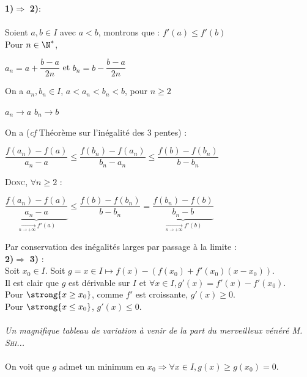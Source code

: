 \documentclass[12pt,a4paper]{report}
\begin{document}
\begin{demo}
\textbf{1)}$\Longrightarrow$ \textbf{2)}\footnotemark : \\
\\
Soient $a,b \in I$ avec $a<b$, montrons que : $f'(a)\leq f'(b)$\\
Pour $n\in \N^*$,
\begin{center}
    $a_n = a+ \dfrac{b-a}{2n}$ et $b_n = b- \dfrac{b-a}{2n}$
\end{center} 
On a $a_n,b_n \in I$, $a<a_n<b_n<b$, pour $n\geq 2$
\begin{center}
    $a_n \to a$ \: \: \: \: \: \:$b_n \to b$
\end{center}
On a (\textit{cf} Théorème sur l'inégalité des 3 pentes) :
\begin{center}
    $\dfrac{f(a_n)-f(a)}{a_n - a} \leq \dfrac{f(b_n)-f(a_n)}{b_n - a_n} \leq \dfrac{f(b)-f(b_n)}{b - b_n}$
\end{center}
\textsc{Donc, $\forall n \geq 2$ :}
\begin{center}
    $\underbrace{\dfrac{f(a_n)-f(a)}{a_n - a}}_{\xrightarrow[n \to + \infty]{}f'(a)}\leq \dfrac{f(b)-f(b_n)}{b - b_n} = \underbrace{\dfrac{f(b_n)-f(b)}{b_n - b}}_{\xrightarrow[n \to + \infty]{}f'(b)}$
\end{center}
Par conservation des inégalités larges par passage à la limite :  \\ 

\textbf{2)}$\Longrightarrow$ \textbf{3)} : \\
Soit $x_0 \in I$. Soit $g = x \in I \mapsto f(x)-(f(x_0)+f'(x_0)(x-x_0))$. \\
Il est clair que $g$ est dérivable sur $I$ et $\forall x \in I, g'(x) = f'(x)-f'(x_0)$. \\
Pour $\strong{x \ge x_0}$, comme $f'$ est croissante, $g'(x)\ge 0$. \\
Pour $\strong{x \le x_0}$, $g'(x) \le 0$. \\ \\
\textit{Un magnifique tableau de variation à venir de la part du merveilleux vénéré \textsc{M. Shi}...} \\ \\
On voit que $g$ admet un minimum en $x_0 \Longrightarrow \forall x \in I, g(x) \ge g(x_0) = 0$. \\


\end{demo}
\end{document}
